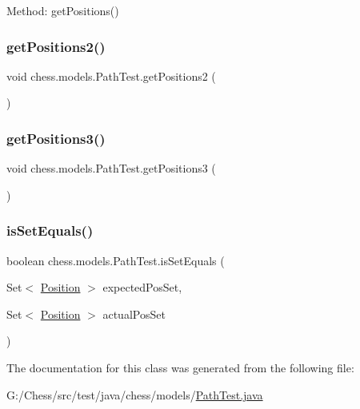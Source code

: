 Method\+: get\+Positions() \mbox{\label{classchess_1_1models_1_1_path_test_a572cc15adf7eb579533b04040f14fc41}} 
\subsubsection{\texorpdfstring{get\+Positions2()}{getPositions2()}}
{\footnotesize\ttfamily void chess.\+models.\+Path\+Test.\+get\+Positions2 (\begin{DoxyParamCaption}{ }\end{DoxyParamCaption})}

\mbox{\label{classchess_1_1models_1_1_path_test_a42e6278bdbd086dbb1394c8bf873a0af}} 
\subsubsection{\texorpdfstring{get\+Positions3()}{getPositions3()}}
{\footnotesize\ttfamily void chess.\+models.\+Path\+Test.\+get\+Positions3 (\begin{DoxyParamCaption}{ }\end{DoxyParamCaption})}

\mbox{\label{classchess_1_1models_1_1_path_test_a6c2cec1f3d389067e84ff5fe93a6b6a8}} 
\subsubsection{\texorpdfstring{is\+Set\+Equals()}{isSetEquals()}}
{\footnotesize\ttfamily boolean chess.\+models.\+Path\+Test.\+is\+Set\+Equals (\begin{DoxyParamCaption}\item[{Set$<$ \mbox{\hyperlink{classchess_1_1models_1_1_position}{Position}} $>$}]{expected\+Pos\+Set,  }\item[{Set$<$ \mbox{\hyperlink{classchess_1_1models_1_1_position}{Position}} $>$}]{actual\+Pos\+Set }\end{DoxyParamCaption})}



The documentation for this class was generated from the following file\+:\begin{DoxyCompactItemize}
\item 
G\+:/\+Chess/src/test/java/chess/models/\mbox{\hyperlink{_path_test_8java}{Path\+Test.\+java}}\end{DoxyCompactItemize}
